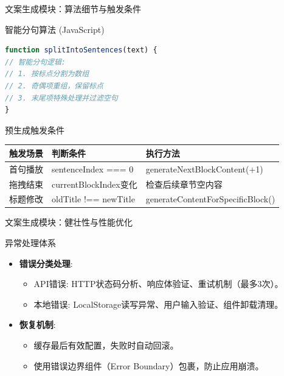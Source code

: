 \documentclass{beamer}
\begin{document}
\begin{frame}[fragile]{文案生成模块：算法细节与触发条件}
\begin{block}{智能分句算法 (JavaScript)}
\begin{lstlisting}[language=JavaScript]
function splitIntoSentences(text) {
// 智能分句逻辑:
// 1. 按标点分割为数组
// 2. 奇偶项重组，保留标点
// 3. 末尾项特殊处理并过滤空句
}
\end{lstlisting}
\end{block}
\begin{block}{预生成触发条件}
\centering
\small
\begin{tabular}{|l|l|l|}
\hline
\textbf{触发场景} & \textbf{判断条件} & \textbf{执行方法} \\ %
\hline
首句播放 & sentenceIndex === 0 & generateNextBlockContent(+1) \\ %
拖拽结束 & currentBlockIndex变化 & 检查后续章节空内容 \\ %
标题修改 & oldTitle !== newTitle & generateContentForSpecificBlock() \\ %
\hline
\end{tabular}
\end{block}
\end{frame}



\begin{frame}{文案生成模块：健壮性与性能优化}
\begin{block}{异常处理体系}
\begin{itemize}
\item \textbf{错误分类处理}:
\begin{itemize}
\item API错误: HTTP状态码分析、响应体验证、重试机制（最多3次）。
\item 本地错误: LocalStorage读写异常、用户输入验证、组件卸载清理。
\end{itemize}
\item \textbf{恢复机制}:
\begin{itemize}
\item 缓存最后有效配置，失败时自动回滚。
\item 使用错误边界组件（Error Boundary）包裹，防止应用崩溃。
\end{itemize}
\end{itemize}
\end{block}
\end{frame}
\end{document}
